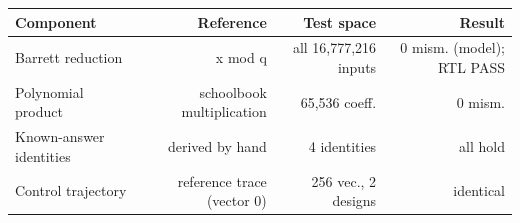 \begin{tabular}{@{}lrrr@{}}
\toprule
Component & Reference & Test space & Result \\
\midrule
Barrett reduction & x mod q & all 16,777,216 inputs & 0 mism. (model); RTL PASS \\
Polynomial product & schoolbook multiplication & 65,536 coeff. & 0 mism. \\
Known-answer identities & derived by hand & 4 identities & all hold \\
Control trajectory & reference trace (vector 0) & 256 vec., 2 designs & identical \\
\bottomrule
\end{tabular}
